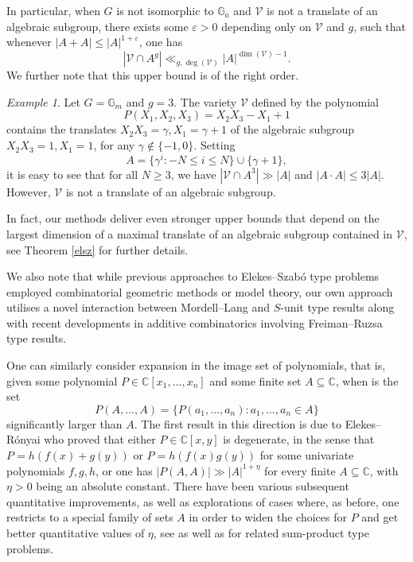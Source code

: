 \documentclass[12pt, reqno]{amsart}
\newcommand{\G}{\mathbb{G}}
\theoremstyle{remark}
\newtheorem{example}[theorem]{Example}
\theoremstyle{definition}
\numberwithin{equation}{section}
\begin{document}
In particular, when $G$ is not isomorphic to $\mathbb{G}_a$ and $\mathcal{V}$ is not a translate of an algebraic subgroup, there exists some $\varepsilon >0$ depending only on $\mathcal{V}$ and $g$,  such that whenever $|A+A| \leq |A|^{1  + \varepsilon}$, one has 
\[ |\mathcal{V}\cap A^g| \ll_{g, \deg(\mathcal{V})} |A|^{\dim(\mathcal{V}) - 1}. \]
We further note that this upper bound is of the right order.

\begin{example} \label{cosetexample}
    Let $G = \G_m$ and $g = 3$. The variety $\mathcal{V}$ defined by the polynomial 
\begin{equation}  \label{degenex}
P(X_1, X_2, X_3) = X_2X_3 - X_1 + 1 
\end{equation}
contains the translates $X_2X_3 = \gamma, X_1 = \gamma + 1$ of the algebraic subgroup $X_2 X_3 = 1, X_1 = 1$, for any $\gamma \not \in \{-1, 0\}$. Setting 
\[ A = \{\gamma^i : -N \leq i \leq N\}\cup\{\gamma + 1\},\]
it is easy to see that for all $N \geq 3$, we have $|\mathcal{V}\cap A^3| \gg |A|$ and $|A\cdot A| \leq 3|A|$. However, $\mathcal{V}$ is not a translate of an algebraic subgroup.  
\end{example}

In fact, our methods deliver even stronger upper bounds that depend on the largest dimension of a maximal translate of an algebraic subgroup contained in $\mathcal{V}$, see Theorem \ref{elsz} for further details. 


We also note that while previous approaches to Elekes--Szab\'{o} type problems employed combinatorial geometric methods or model theory, our own approach utilises a novel interaction between Mordell--Lang and $S$-unit type results along with recent developments in additive combinatorics involving Freiman--Ruzsa type results.



One can similarly consider expansion in the image set of polynomials, that is, given some polynomial $P \in \mathbb{C}[x_1, \dots, x_n]$ and some finite set $A \subseteq \mathbb{C}$, when is the set 
\[ P(A, \dots, A) = \{ P(a_1, \dots, a_n) : a_1, \dots, a_n \in A\}\]
significantly larger than $A$. The first result in this direction is due to Elekes--R\'{o}nyai \cite{ER2000} who proved that either $P \in \mathbb{C}[x,y]$ is degenerate, in the sense that $P = h(f(x) + g(y))$ or $P = h(f(x)g(y))$ for some univariate polynomials $f,g,h$, or one has $|P(A,A)| \gg |A|^{1 + \eta}$ for every finite $A \subseteq \mathbb{C}$, with $\eta>0$ being an absolute constant. There have been various subsequent quantitative improvements, as well as explorations of cases where, as before, one restricts to a special family of sets $A$ in order to widen the choices for $P$ and get better quantitative values of $\eta$, see \cite{BB2021, JRT2022, Mu2024a} as well as \cite{HRNZ2020, Mu2024b} for related sum-product type problems.
\end{document}
